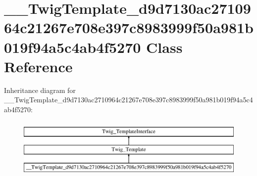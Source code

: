 \hypertarget{class_____twig_template__d9d7130ac2710964c21267e708e397c8983999f50a981b019f94a5c4ab4f5270}{}\section{\+\_\+\+\_\+\+Twig\+Template\+\_\+d9d7130ac2710964c21267e708e397c8983999f50a981b019f94a5c4ab4f5270 Class Reference}
\label{class_____twig_template__d9d7130ac2710964c21267e708e397c8983999f50a981b019f94a5c4ab4f5270}
Inheritance diagram for \+\_\+\+\_\+\+Twig\+Template\+\_\+d9d7130ac2710964c21267e708e397c8983999f50a981b019f94a5c4ab4f5270\+:\begin{figure}[H]
\begin{center}
\leavevmode
\includegraphics[height=3.000000cm]{class_____twig_template__d9d7130ac2710964c21267e708e397c8983999f50a981b019f94a5c4ab4f5270}
\end{center}
\end{figure}
